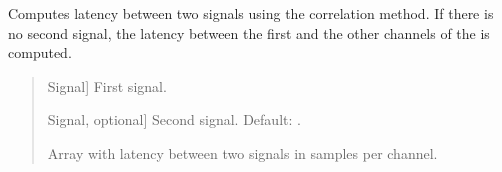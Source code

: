 \documentclass[letterpaper,10pt,english]{sphinxmanual}
\begin{document}
\begin{fulllineitems}
\label{\detokenize{modules/dsptools.standard_functions:dsptools.standard_functions.latency}}
\pysigstartsignatures
{}
\pysigstopsignatures
\sphinxAtStartPar
Computes latency between two signals using the correlation method.
If there is no second signal, the latency between the first and the other
channels of the is computed.
\begin{quote}\begin{description}
\begin{description}
\sphinxlineitem{\sphinxstylestrong{in1}}{[}Signal{]}
\sphinxAtStartPar
First signal.

\sphinxlineitem{\sphinxstylestrong{in2}}{[}Signal, optional{]}
\sphinxAtStartPar
Second signal. Default: .

\end{description}

\begin{description}
\sphinxlineitem{\sphinxstylestrong{latency\_per\_channel\_samples}}{[}\sphinxtitleref{np.ndarray}{]}
\sphinxAtStartPar
Array with latency between two signals in samples per channel.

\end{description}

\end{description}\end{quote}

\end{fulllineitems}

\end{document}
